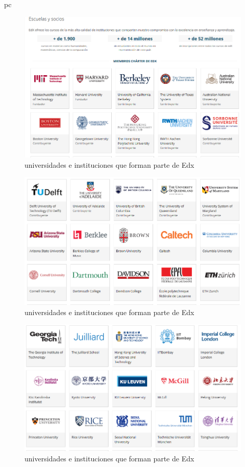 pc\documentclass[a4paper,12pt,openany]{book}
\begin{document}
\begin{figure}[ht]
  \centering
	\includegraphics[width=12cm]{edx10-1.png}
\caption{universidades e instituciones que forman parte de Edx}
  \label{fig:edx10-1}
\end{figure}

\begin{figure}[ht]
  \centering
	\includegraphics[width=12cm]{edx10-2.png}
\caption{universidades e instituciones que forman parte de Edx}
  \label{fig:edx10-2}
\end{figure}

\begin{figure}[ht]
  \centering
	\includegraphics[width=12cm]{edx10-3.png}
\caption{universidades e instituciones que forman parte de Edx}

  \label{fig:edx10-3}
\end{figure}
\end{document}
